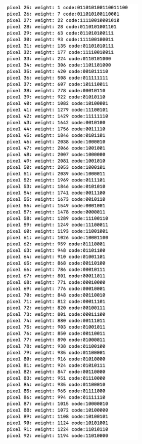 \begin{enumerate}
\begin{figure}[htbp]
                \end{figure}
                \begin{figure}[htbp]
                    \centering
                    \includegraphics*[width = 7cm]{s3_8_0.png}

\end{figure}
\end{enumerate}
